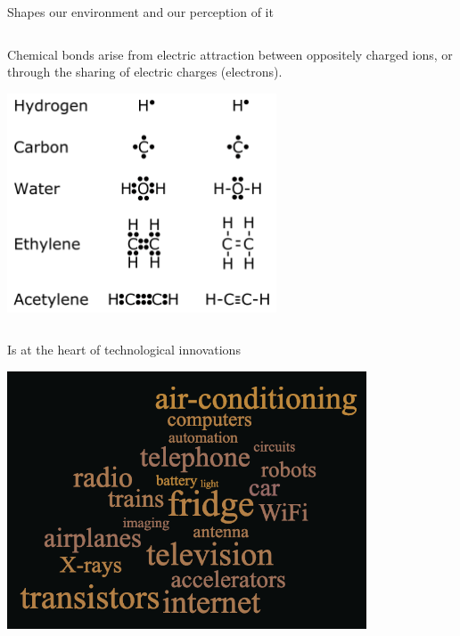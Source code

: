 \begin{frame}{Shapes our environment and our perception of it}
\begin{columns}
\begin{column}{0.50\textwidth}
\begin{center}
    \end{center}
    {\scriptsize
      Chemical bonds arise from electric attraction between oppositely charged ions,
      or through the sharing of electric charges (electrons).\\
    }
    \begin{center}
     \includegraphics[width=0.60\textwidth]{./images/misc/bonds.png}\\
    \end{center}

  \end{column}
\end{columns}

\end{frame}

%
%
%

\begin{frame}{Is at the heart of technological innovations}

  \begin{center}
    \includegraphics[width=0.80\textwidth]{./images/misc/word_cloud_apps.png}\\
  \end{center}

\end{frame}

